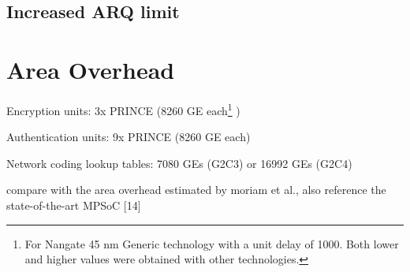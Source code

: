 \subsection{Increased ARQ limit}

\section{Area Overhead}
Encryption units: 3x PRINCE (8260 GE each\footnote{For Nangate 45 nm Generic technology with a unit delay of 1000. Both lower and higher values were
obtained with other technologies.} \cite[16]{borghoff12prince})

Authentication units: 9x PRINCE (8260 GE each)

Network coding lookup tables: 7080 GEs (G2C3) or 16992 GEs (G2C4) \cite[5]{moriam18activeattackers}

compare with the area overhead estimated by moriam et al., also reference the state-of-the-art MPSoC [14]

\iffalse
"Results for IWA-NC confirm the alleged positive effect of NC in unreliable networks"

"Creation rate adjustment to keep the base injection rate constant is reflected in the differing information rates"

"IDA: 4 flits need to arrive unharmed for successful transmission unit, 3 for FGA, and 2 for IWA"

"NC proves to provide a performance improvement, although more in the sense of less residual errors than a decrease in latency since ARQs are still
limited to 1 per transmission unit across all variants."
\fi
